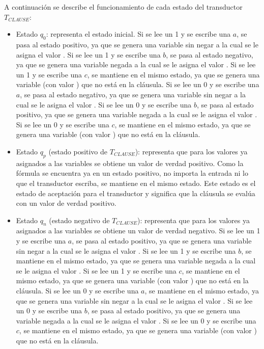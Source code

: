 A continuación se describe el funcionamiento de cada estado del transductor $T_{CLAUSE}$:
\begin{itemize}
    \item Estado $q_0$: representa el estado inicial.  Si se lee un 1 y se escribe una $a$, se pasa al estado positivo, ya que se genera una variable sin negar a la cual se le asigna el valor \true{}.  Si se lee un 1 y se escribe una $b$, se pasa al estado negativo, ya que se genera una variable negada a la cual se le asigna el valor \true{}.  Si se lee un 1 y se escribe una $c$, se mantiene en el mismo estado, ya que se genera una variable (con valor \true) que no está en la cláusula.  Si se lee un 0 y se escribe una $a$, se pasa al estado negativo, ya que se genera una variable sin negar a la cual se le asigna el valor \false{}.  Si se lee un 0 y se escribe una $b$, se pasa al estado positivo, ya que se genera una variable negada a la cual se le asigna el valor \false{}.  Si se lee un 0 y se escribe una $c$, se mantiene en el mismo estado, ya que se genera una variable (con valor \false) que no está en la cláusula.
          
    \item Estado $q_p$ (estado positivo de $T_{CLAUSE}$): representa que para los valores ya asignados a las variables se obtiene un valor de verdad positivo.  Como la fórmula se encuentra ya en un estado positivo, no importa la entrada ni lo que el transductor escriba, se mantiene en el mismo estado.  Este estado es el estado de aceptación para el transductor y significa que la cláusula se evalúa con un valor de verdad positivo.
          
    \item Estado $q_n$ (estado negativo de $T_{CLAUSE}$): representa que para los valores ya asignados a las variables se obtiene un valor de verdad negativo.  Si se lee un 1 y se escribe una $a$, se pasa al estado positivo, ya que se genera una variable sin negar a la cual se le asigna el valor \true{}.  Si se lee un 1 y se escribe una $b$, se mantiene en el mismo estado, ya que se genera una variable negada a la cual se le asigna el valor \true{}.  Si se lee un 1 y se escribe una $c$, se mantiene en el mismo estado, ya que se genera una variable (con valor \true) que no está en la cláusula. Si se lee un 0 y se escribe una $a$, se mantiene en el mismo estado, ya que se genera una variable sin negar a la cual se le asigna el valor \false{}.  Si se lee un 0 y se escribe una $b$, se pasa al estado positivo, ya que se genera una variable negada a la cual se le asigna el valor \false{}.  Si se lee un 0 y se escribe una $c$, se mantiene en el mismo estado, ya que se genera una variable (con valor \false) que no está en la cláusula.
\end{itemize}

